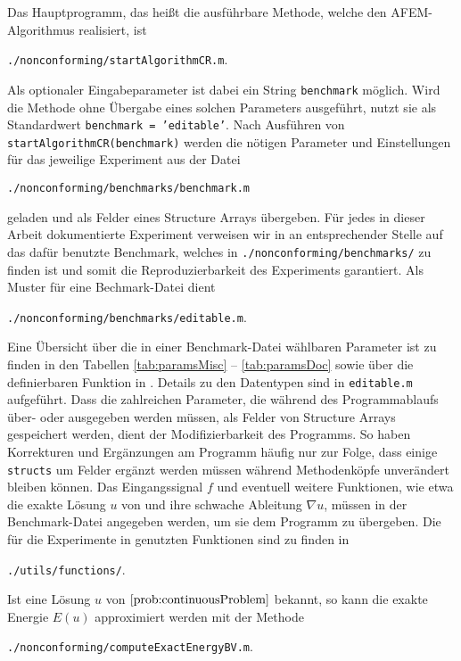 Das Hauptprogramm, das heißt die ausführbare Methode, welche den
AFEM\--Al\-go\-rith\-mus realisiert, ist
\begin{center}
  \texttt{./nonconforming/startAlgorithmCR.m}.
\end{center}
Als optionaler Eingabeparameter ist dabei ein String \texttt{benchmark}
möglich. 
Wird die Methode ohne Übergabe eines solchen Parameters ausgeführt, nutzt
sie als Standardwert \texttt{benchmark = 'editable'}.
Nach Ausführen von \texttt{startAlgorithmCR(benchmark)} werden die nötigen
Parameter und Einstellungen für das jeweilige Experiment aus der Datei
\begin{center}
  \texttt{./nonconforming/benchmarks/benchmark.m}
\end{center}
geladen und als Felder eines Structure Arrays übergeben. 
Für jedes in dieser Arbeit dokumentierte Experiment verweisen wir in
 an entsprechender Stelle auf das dafür benutzte
Benchmark, welches in \texttt{./nonconforming/benchmarks/} zu finden ist und
somit die Reproduzierbarkeit des Experiments garantiert. 
Als Muster für eine Bechmark-Datei dient
\begin{center}
  \texttt{./nonconforming/benchmarks/editable.m}.
\end{center}
Eine Übersicht über die in einer Benchmark-Datei wählbaren Parameter ist
zu finden in den Tabellen \ref{tab:paramsMisc} -- \ref{tab:paramsDoc}
sowie über die definierbaren Funktion in .
Details zu den Datentypen sind in \texttt{editable.m} aufgeführt.
Dass die zahlreichen Parameter, die während des Pro\-gramm\-ab\-laufs
über- oder ausgegeben werden müssen, als Felder von
Struc\-ture Ar\-rays gespeichert werden, dient der Modifizierbarkeit des
Programms. 
So haben Korrekturen und Ergänzungen am Programm häufig nur zur Folge, dass
einige \texttt{structs} um Felder ergänzt werden müssen während Methodenköpfe
unverändert bleiben können.
Das Eingangssignal $f$ und eventuell weitere Funktionen, wie etwa die exakte
Lösung $u$ von  und ihre schwache Ableitung
$\nabla u$, müssen in der Benchmark-Datei angegeben werden, um sie dem
Programm zu übergeben. 
Die für die Experimente in  genutzten Funktionen sind zu
finden in 
\begin{center}
  \texttt{./utils/functions/}.
\end{center}
Ist eine Lösung $u$ von $\Cref{prob:continuousProblem}$ bekannt, so kann die
exakte Energie $E(u)$ approximiert werden mit der Methode
\begin{center}
  \texttt{./nonconforming/computeExactEnergyBV.m}.
\end{center}
